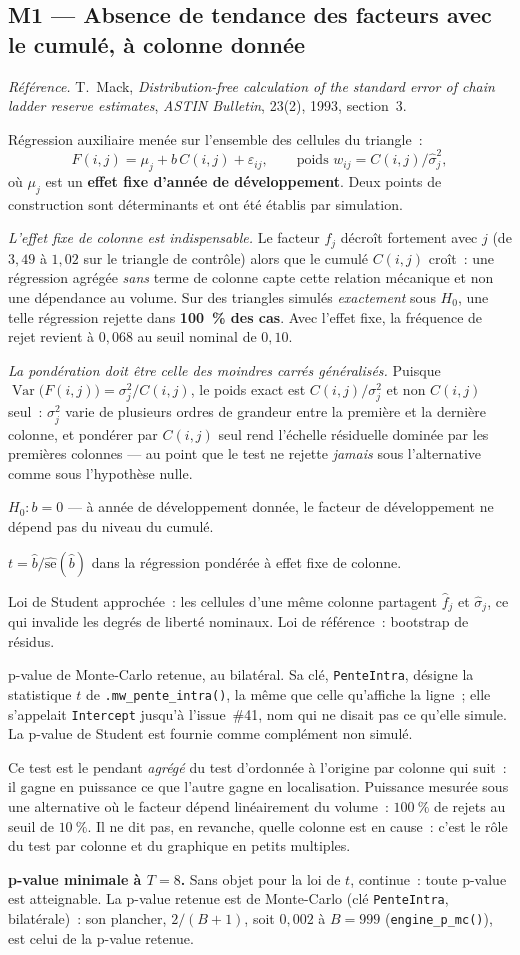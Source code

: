 \documentclass[a4paper,11pt]{article}
\newcommand{\code}[1]{\texttt{\small #1}}
\newcommand{\refl}[1]{{\small\textcolor{maincolor!70!black}{\textit{Référence.} #1}}\par\smallskip}
\newcounter{ficheid}
\newenvironment{fiche}[1]{%
  \stepcounter{ficheid}%
  \phantomsection
  \subsection{#1}%
  \label{fiche:\theficheid}%
}{%
  \end{description}\vspace{0.5em}%
}
\newcommand{\Cadre}{%
  \begin{description}[leftmargin=0pt, style=unboxed, itemsep=3pt, topsep=3pt, parsep=2pt]%
  \item[\textcolor{financeblue}{\textbf{1. Cadre, notations et hypothèses de validité (non testées).}}]}
\newcommand{\Hzero}{\item[\textcolor{financeblue}{\textbf{2. Hypothèse nulle.}}]}
\newcommand{\Stat}{\item[\textcolor{financeblue}{\textbf{3. Statistique de test.}}]}
\newcommand{\Loi}{\item[\textcolor{financeblue}{\textbf{4. Loi sous $H_0$.}}]}
\newcommand{\Pval}{\item[\textcolor{financeblue}{\textbf{5. p-value.}}]}
\newcommand{\Usage}{\item[\textcolor{financeblue}{\textbf{6. Usage et limites.}}]}
\newcommand{\Pertinence}{\item[\textcolor{financeblue}{\textbf{7. Pertinence et puissance à faible $T$.}}]}
\begin{document}
\begin{fiche}{M1 --- Absence de tendance des facteurs avec le cumulé, à colonne donnée}
\label{mw:m1}
\refl{T.~Mack, \emph{Distribution-free calculation of the standard error of chain
ladder reserve estimates}, \emph{ASTIN Bulletin}, 23(2), 1993, section~3.}
\Cadre
Régression auxiliaire menée sur l'ensemble des cellules du triangle~:
\[
  F(i,j) = \mu_j + b\,C(i,j) + \varepsilon_{ij},
  \qquad \text{poids } w_{ij} = C(i,j)/\hat\sigma_j^2 ,
\]
où $\mu_j$ est un \textbf{effet fixe d'année de développement}. Deux points de
construction sont déterminants et ont été établis par simulation.

\emph{L'effet fixe de colonne est indispensable.} Le facteur $f_j$ décroît
fortement avec $j$ (de $3{,}49$ à $1{,}02$ sur le triangle de contrôle) alors que
le cumulé $C(i,j)$ croît~: une régression agrégée \emph{sans} terme de colonne
capte cette relation mécanique et non une dépendance au volume. Sur des triangles
simulés \emph{exactement} sous $H_0$, une telle régression rejette dans
\textbf{100~\% des cas}. Avec l'effet fixe, la fréquence de rejet revient à
$0{,}068$ au seuil nominal de $0{,}10$.

\emph{La pondération doit être celle des moindres carrés généralisés.} Puisque
$\operatorname{Var}\big(F(i,j)\big) = \sigma_j^2/C(i,j)$, le poids exact est
$C(i,j)/\sigma_j^2$ et non $C(i,j)$ seul~: $\sigma_j^2$ varie de plusieurs ordres
de grandeur entre la première et la dernière colonne, et pondérer par $C(i,j)$
seul rend l'échelle résiduelle dominée par les premières colonnes --- au point
que le test ne rejette \emph{jamais} sous l'alternative comme sous l'hypothèse
nulle.
\Hzero
$H_0 : b = 0$ --- à année de développement donnée, le facteur de développement ne
dépend pas du niveau du cumulé.
\Stat
$t = \hat b / \widehat{\mathrm{se}}(\hat b)$ dans la régression pondérée à effet
fixe de colonne.
\Loi
Loi de Student approchée~: les cellules d'une même colonne partagent $\hat f_j$
et $\hat\sigma_j$, ce qui invalide les degrés de liberté nominaux. Loi de
référence~: bootstrap de résidus.
\Pval
p-value de Monte-Carlo retenue, au bilatéral. Sa clé, \code{PenteIntra}, désigne la
statistique $t$ de \code{.mw\_pente\_intra()}, la même que celle qu'affiche la ligne~; elle s'appelait
\code{Intercept} jusqu'à l'issue~\#41, nom qui ne disait pas ce qu'elle simule. La p-value
de Student est fournie comme complément non simulé.
\Usage
Ce test est le pendant \emph{agrégé} du test d'ordonnée à l'origine par colonne
qui suit~: il gagne en puissance ce que l'autre gagne en localisation. Puissance
mesurée sous une alternative où le facteur dépend linéairement du volume~:
$100~\%$ de rejets au seuil de $10~\%$. Il ne dit pas, en revanche, quelle
colonne est en cause~: c'est le rôle du test par colonne et du graphique en
petits multiples.
\Pertinence
\textbf{p-value minimale à $T = 8$.} Sans objet pour la loi de $t$, continue~: toute p-value est atteignable. La p-value retenue est de Monte-Carlo (clé \code{PenteIntra}, bilatérale)~: son plancher, $2/(B+1)$, soit $0{,}002$ à $B = 999$ (\code{engine\_p\_mc()}), est celui de la p-value retenue.


\end{fiche}
\end{document}
